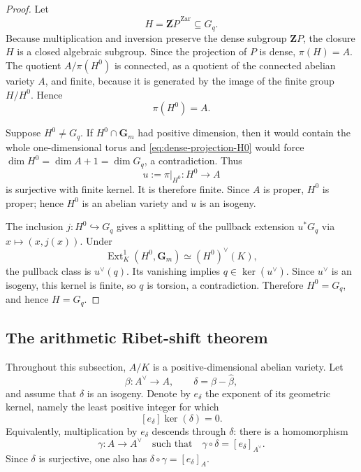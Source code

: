 \documentclass[11pt,letterpaper,reqno]{amsart}
\theoremstyle{definition}
\theoremstyle{remark}
\newcommand{\Gm}{\mathbf G_m}
\newcommand{\Ext}{\operatorname{Ext}}
\newcommand{\Zar}{\mathrm{Zar}}
\begin{document}
\begin{proof}
Let
\[
 H=\overline{\mathbf ZP}^{\,\Zar}\subseteq G_q.
\]
Because multiplication and inversion preserve the dense subgroup
$\mathbf ZP$, the closure $H$ is a closed algebraic subgroup.  Since the
projection of $P$ is dense, $\pi(H)=A$.  The quotient
$A/\pi(H^0)$ is connected, as a quotient of the connected abelian variety
$A$, and finite, because it is generated by the image of the finite group
$H/H^0$.  Hence
\begin{equation}\label{eq:dense-projection-H0}
 \pi(H^0)=A.
\end{equation}

Suppose $H^0\ne G_q$.  If $H^0\cap\Gm$ had positive dimension, then it would
contain the whole one-dimensional torus and
\eqref{eq:dense-projection-H0} would force
$\dim H^0=\dim A+1=\dim G_q$, a contradiction.  Thus
\[
 u:=\pi|_{H^0}:H^0\longrightarrow A
\]
is surjective with finite kernel.  It is therefore finite.  Since $A$ is
proper, $H^0$ is proper; hence $H^0$ is an abelian variety and $u$ is an
isogeny.

The inclusion $j:H^0\hookrightarrow G_q$ gives a splitting of the pullback
extension $u^*G_q$ via $x\mapsto(x,j(x))$.  Under
\[
 \Ext_K^1(H^0,\Gm)\simeq(H^0)^\vee(K),
\]
the pullback class is $u^\vee(q)$.  Its vanishing implies $q\in\ker(u^\vee)$.  Since $u^\vee$ is an
isogeny, this kernel is finite, so $q$ is torsion, a contradiction.
Therefore $H^0=G_q$, and hence $H=G_q$.
\end{proof}

\subsection{The arithmetic Ribet-shift theorem}\label{sec:main}

Throughout this subsection, $A/K$ is a positive-dimensional abelian variety.  Let
\[
 \beta:A^\vee\longrightarrow A,
 \qquad
 \delta=\beta-\widehat\beta,
\]
and assume that $\delta$ is an isogeny.  Denote by $e_\delta$ the exponent of
its geometric kernel, namely the least positive integer for which
\begin{equation}\label{eq:kernel-exponent}
 [e_\delta]\ker(\delta)=0.
\end{equation}
Equivalently, multiplication by $e_\delta$ descends through $\delta$: there
is a homomorphism
\[
 \gamma:A\longrightarrow A^\vee
 \quad\text{such that}\quad
 \gamma\circ\delta=[e_\delta]_{A^\vee}.
\]
Since $\delta$ is surjective, one also has
$\delta\circ\gamma=[e_\delta]_A$.
\end{document}
